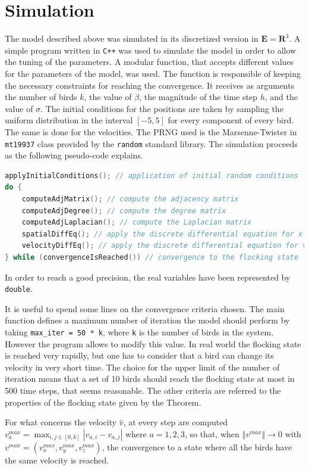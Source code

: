 \documentclass{article} %
\newcounter{other}
\newcounter{math}
\newcounter{late}
\begin{document}
\section {Simulation}
The model described above was simulated in its discretized version in $\mathbf{E}=\mathbf{R}^3$.
A simple program written in \verb|C++| was used to simulate the model in order to allow the
tuning of the parameters.
A modular function, that accepts different values for the parameters of the model, was used.
The function is responsible of keeping the necessary constraints for reaching the convergence.
It receives as arguments the number of birds $k$, the value of $\beta$, the magnitude of the 
time step $h$, and the value of $\sigma$.
The initial conditions for the positions are taken by sampling the uniform 
distribution in the interval $[-5,5]$ for every component of every bird.
The same is done for the velocities.
The PRNG used is the Marsenne-Twister in \Verb|mt19937| class provided by the \verb|random| 
standard library.
The simulation proceeds as the following pseudo-code explains.
\begin{lstlisting}[language=C++]
applyInitialConditions(); // application of initial random conditions
do {
    computeAdjMatrix(); // compute the adjacency matrix
    computeAdjDegree(); // compute the degree matrix
    computeAdjLaplacian(); // compute the Laplacian matrix
    spatialDiffEq(); // apply the discrete differential equation for x
    velocityDiffEq(); // apply the discrete differential equation for v
} while (convergenceIsReached()) // convergence to the flocking state
\end{lstlisting}
In order to reach a good precision, the real variables have been represented by \verb|double|.

It is useful to spend some lines on the convergence criteria chosen. The main function defines
a maximum number of iteration the model should perform by taking \verb|max_iter = 50 * k|, where 
\verb|k| is the number of birds in the system. However the program allows to modify this value.
In real world the flocking state is reached very rapidly, but one has to 
consider that a bird can change its velocity in very short time.
The choice for the upper limit of the number of iteration means that a set of 10 birds should 
reach the flocking state at most in 500 time steps, that seems reasonable.
The other criteria are referred to the properties of the flocking state given by the Theorem.

For what concerns the velocity $\widehat{v}$, at every step are computed 
$v_a^{max} = \max_{i,j\in[0,k]}|v_{a,i} - v_{a,j}|$ where $a=1,2,3$, so that, when 
$\left\Vert v^{max}\right\Vert \rightarrow 0$ with
$v^{max} = (v_x^{max},v_y^{max},v_z^{max})$, the convergence to a state where all the birds 
have the same velocity is reached.
\end{document}
